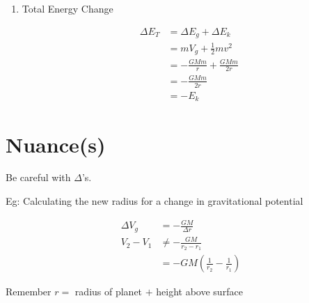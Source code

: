 \documentclass[11pt,a4paper]{article}
\begin{document}
\begin{enumerate}
    \item Total Energy Change

    \begin{equation}
    \begin{aligned}
        \Delta E_T &= \Delta E_g + \Delta E_k\\
        &= mV_g + \frac{1}{2}mv^2\\
        &= -\frac{GMm}{r} + \frac{GMm}{2r}\\
        &= -\frac{GMm}{2r}\\
        &= -E_k   
    \end{aligned}
    \end{equation}
\end{enumerate}
\clearpage

\section{Nuance(s)}
Be careful with $\Delta$'s.

Eg: Calculating the new radius for a change in gravitational potential

\begin{equation}
\begin{aligned}
    \Delta V_g &= -\frac{GM}{\Delta r}\\
    V_2 - V_1 &\neq -\frac{GM}{r_2-r_1}\\
    &= -GM(\frac{1}{r_2}-\frac{1}{r_1})
\end{aligned}
\end{equation}

Remember $r =$ radius of planet $+$ height above surface
\end{document}
